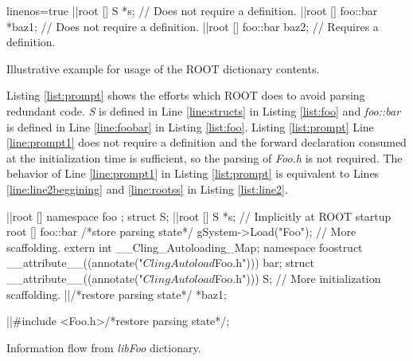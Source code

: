 \documentclass{webofc}
\begin{document}
\begin{listing}[h]
    \noindent
    \begin{minipage}[h]{\textwidth}
    \begin{cppcode*}{linenos=true}
    |\label{line:prompt1}|root [] S *s;           // Does not require a definition.
    |\label{line:prompt2}|root [] foo::bar *baz1; // Does not require a definition.
    |\label{line:prompt3}|root [] foo::bar baz2;  // Requires a definition.
    \end{cppcode*}
    \end{minipage}
    \caption{Illustrative example for usage of the ROOT dictionary contents.}
    \label{list:prompt}
\end{listing}

Listing \ref{list:prompt} shows the efforts which ROOT does to avoid parsing redundant code. {\it S} is defined in Line \ref{line:structs} in Listing \ref{list:foo} and {\it foo::bar} is defined in Line \ref{line:foobar} in Listing \ref{list:foo}. Listing \ref{list:prompt} Line \ref{line:prompt1} does not require a definition and the forward declaration consumed at the initialization time is sufficient, so the parsing of {\it Foo.h} is not required. The behavior of Line \ref{line:prompt1} in Listing \ref{list:prompt} is equivalent to Lines \ref{line:line2beggining} and \ref{line:rootss} in Listing \ref{list:line2}.

\begin{listing}[h]
    \noindent
    \begin{minipage}[h]{.7\textwidth}
    \begin{cppcode*}{}
    |\label{line:line2beggining}|root [] namespace foo { }; struct S;
    |\label{line:rootss}|root [] S *s; // Implicitly at ROOT startup
    root [] foo::bar /*store parsing state*/
    gSystem->Load("Foo");
    // More scaffolding.
    extern int __Cling_Autoloading_Map;
    namespace foo{struct __attribute__((annotate("$ClingAutoload$Foo.h"))) bar;}
    struct __attribute__((annotate("$ClingAutoload$Foo.h"))) S;
    // More initialization scaffolding.
    |\label{line:beforerestoreparsing}|/*restore parsing state*/ *baz1;
    
    |\label{line:restoreparsing}|#include <Foo.h>/*restore parsing state*/;
    \end{cppcode*}
    \end{minipage}
    \caption{Information flow from {\it libFoo} dictionary.}
    \label{list:line2}
\end{listing}
\end{document}
